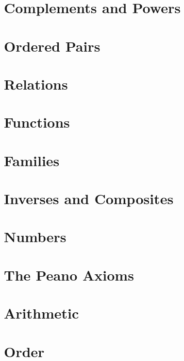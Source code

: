 \documentclass[fontsize=12pt,b5paper,
pagesize=auto]{book}
\theoremstyle{axiom}
\theoremstyle{exc}
\begin{document}
\chapter{Complements and Powers} 


\chapter{Ordered Pairs}


\chapter{Relations}


\chapter{Functions}


\chapter{Families}


\chapter{Inverses and Composites}


\chapter{Numbers}


\chapter{The Peano Axioms}


\chapter{Arithmetic}


\chapter{Order}

\end{document}
